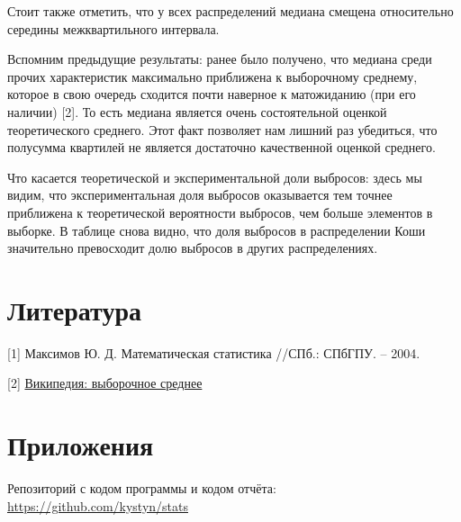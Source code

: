 Стоит также отметить, что у всех распределений медиана смещена относительно середины межквартильного интервала. 

Вспомним предыдущие результаты: ранее было получено, что медиана среди прочих характеристик максимально приближена к выборочному среднему, которое в свою очередь сходится почти наверное к матожиданию (при его наличии) [2]. То есть медиана является очень состоятельной оценкой теоретического среднего. Этот факт позволяет нам лишний раз убедиться, что полусумма квартилей не является достаточно качественной оценкой среднего.

Что касается теоретической и экспериментальной доли выбросов: здесь мы видим, что экспериментальная доля выбросов оказывается тем точнее приближена к теоретической вероятности выбросов, чем больше элементов в выборке. В таблице снова видно, что доля выбросов в распределении Коши значительно превосходит долю выбросов в других распределениях.

\section{Литература}
[1] Максимов Ю. Д. Математическая статистика //СПб.: СПбГПУ. – 2004.

[2] \href{https://ru.wikipedia.org/wiki/%D0%92%D1%8B%D0%B1%D0%BE%D1%80%D0%BE%D1%87%D0%BD%D0%BE%D0%B5_%D1%81%D1%80%D0%B5%D0%B4%D0%BD%D0%B5%D0%B5}{Википедия: выборочное среднее}

\section{Приложения}

Репозиторий с кодом программы и кодом отчёта: \href{https://github.com/kystyn/stats}{https://github.com/kystyn/stats}


